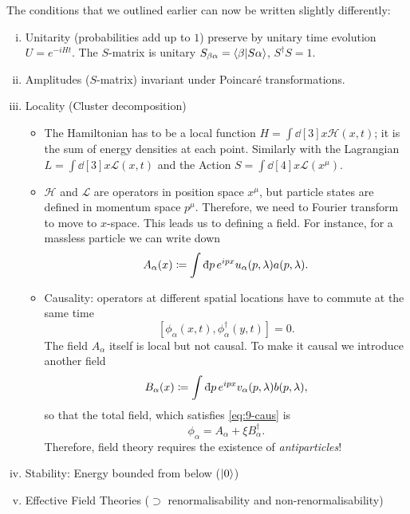 The conditions that we outlined earlier can now be written slightly differently:
\begin{enumerate}[(i)]
  \item Unitarity (probabilities add up to $1$) preserve by unitary time evolution $U = e^{-i H t}$. The $S$-matrix is unitary $S_{\beta\alpha} = \bra{\beta} \ket{S \alpha}$, $S^{\dagger} S = 1$.
  \item Amplitudes ($S$-matrix) invariant under Poincaré transformations.
  \item Locality (Cluster decomposition)
    \begin{itemize}
      \item The Hamiltonian  has to be a local function $H = \int \dd[3]{x} \mathscr{H}(x, t)$; it is the sum of energy densities at each point. Similarly with the Lagrangian $L = \int \dd[3]{x} \mathscr{L}(x, t)$  and the Action $S = \int \dd[4]{x} \mathscr{L}(x^{\mu})$.
      \item $\mathscr{H}$ and $\mathscr{L}$ are operators in position space $x^{\mu}$, but particle states are defined in momentum space $p^{\mu}$. Therefore, we need to Fourier transform to move to $x$-space.
	This leads us to defining a field. For instance, for a massless particle we can write down
	\begin{equation}
	  A_{\alpha}(x) \coloneqq \int \bdd[]{p} e^{i p x} u_{\alpha}(p, \lambda) a(p, \lambda).
	\end{equation}
      \item Causality: operators at different spatial locations have to commute at the same time
	\begin{equation}
	  \label{eq:9-caus}
	  [\phi_{\alpha}(x, t), \phi^{\dagger}_{\alpha}(y, t)] = 0.
	\end{equation}
	The field $A_{\alpha}$ itself is local but not causal. To make it causal we introduce another field
	\begin{equation}
	  B_{\alpha}(x) \coloneqq \int \bdd[]{p} e^{i p x} v_{\alpha}(p, \lambda) b(p, \lambda),
	\end{equation}
	so that the total field, which satisfies \eqref{eq:9-caus} is
	\begin{equation}
	  \phi_{\alpha} = A_{\alpha} + \xi B^{\dagger}_{\alpha}.
	\end{equation}
	Therefore, field theory requires the existence of \emph{antiparticles}!
    \end{itemize}
  \item Stability: Energy bounded from below ($\ket{0}$)
  \item Effective Field Theories ($\supset$ renormalisability and non-renormalisability)

\end{enumerate}
